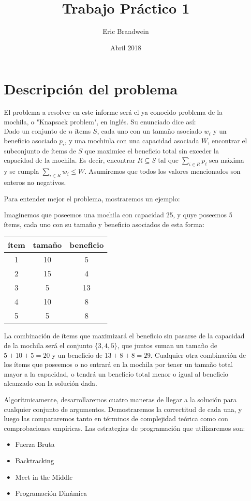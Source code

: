 \documentclass[10pt, a4paper]{article}
\title{Trabajo Pr\'actico 1}
\author{Eric Brandwein}
\date{Abril 2018}
\begin{document}
\maketitle

\tableofcontents

\pagebreak


\section{Descripci\'on del problema}

El problema a resolver en este informe será el ya conocido problema de la mochila, o "Knapsack problem", en inglés. Su enunciado dice así: \\
Dado un conjunto de $n$ ítems $S$, cada uno con un tamaño asociado $w_i$ y un beneficio asociado $p_i$, y una mochiula con una capacidad asociada $W$, encontrar el subconjunto de ítems de $S$ que maximice el beneficio total sin exceder la capacidad de la mochila. Es decir, encontrar $R \subseteq S$ tal que $\sum_{i \in R} p_i$ sea máxima y se cumpla $\sum_{i \in R} w_i \leq W$. Asumiremos que todos los valores mencionados son enteros no negativos.\par

Para entender mejor el problema, mostraremos un ejemplo: \par
Imaginemos que poseemos una mochila con capacidad 25, y quye poseemos 5 ítems, cada uno con su tamaño y beneficio asociados de esta forma:
\begin{tabular}{c|c|c}
	ítem & tamaño & beneficio \\ \hline
	1 & 10 & 5 \\
	2 & 15 & 4 \\
	3 & 5 & 13 \\
	4 & 10 & 8 \\
	5 & 5 & 8
\end{tabular}
La combinación de ítems que maximizará el beneficio sin pasarse de la capacidad de la mochila será el conjunto $\{3, 4, 5\}$, que juntos suman un tamaño de $5 + 10 + 5 = 20$ y un beneficio de $13 + 8 + 8 = 29$. Cualquier otra combinación de los ítems que poseemos o no entrará en la mochila por tener un tamaño total mayor a la capacidad, o tendrá un beneficio total menor o igual al beneficio alcanzado con la solución dada. \par

Algorítmicamente, desarrollaremos cuatro maneras de llegar a la solución para cualquier conjunto de argumentos. Demostraremos la correctitud de cada una, y luego las compararemos tanto en términos de complejidad teórica como con comprobaciones empíricas. Las estrategias de programación que utilizaremos son:
\begin{itemize}
	\item Fuerza Bruta
	\item Backtracking
	\item Meet in the Middle
	\item Programación Dinámica
\end{itemize}
\end{document}
